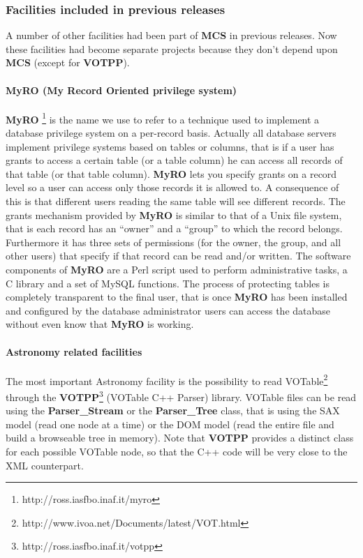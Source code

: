 \documentclass[12pt,titlepage]{article}
\newcommand{\mcs}{\textbf{MCS} }
\newcommand{\myro}{\textbf{MyRO} }
\begin{document}
%
\subsubsection{Facilities included in previous releases}
\label{sec:previous:facilities}
A number of other facilities had been part of \mcs in previous
releases. Now these facilities had become separate projects because
they don't depend upon \mcs (except for \textbf{VOTPP}).

\paragraph{\myro (My Record Oriented privilege system)}
\hspace{1cm} \newline \myro\footnote{http://ross.iasfbo.inaf.it/myro} is the
name we use to refer to a technique used to implement a database privilege
system on a per-record basis. Actually all database servers implement
privilege systems based on tables or columns, that is if a user has grants to
access a certain table (or a table column) he can access all records of that
table (or that table column). \myro lets you specify grants on a record level
so a user can access only those records it is allowed to. A consequence of
this is that different users reading the same table will see different
records. The grants mechanism provided by \myro is similar to that of a Unix
file system, that is each record has an ``owner'' and a ``group'' to which the
record belongs. Furthermore it has three sets of permissions (for the owner,
the group, and all other users) that specify if that record can be read and/or
written. The software components of \myro are a Perl script used to perform
administrative tasks, a C library and a set of MySQL functions. The process of
protecting tables is completely transparent to the final user, that is once
\myro has been installed and configured by the database administrator users
can access the database without even know that \myro is working.

%
\paragraph{Astronomy related facilities}
\hspace{1cm} \newline
The most important Astronomy facility is the possibility to read
VOTable\footnote{http://www.ivoa.net/Documents/latest/VOT.html} through the
\textbf{VOTPP}\footnote{http://ross.iasfbo.inaf.it/votpp} (VOTable C++ Parser)
library. VOTable files can be read using the \textbf{Parser\_Stream} or the
\textbf{Parser\_Tree} class, that is using the SAX model (read one node at a
time) or the DOM model (read the entire file and build a browseable tree in
memory). Note that \textbf{VOTPP} provides a distinct class for each possible
VOTable node, so that the C++ code will be very close to the XML counterpart.
\end{document}
